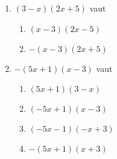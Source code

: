 
\begin{exercice}\label{exosmath-0204}

    \begin{enumerate}
        \item
            \( (3-x)(2x+5)\) vaut
            \begin{enumerate}
                \item
                    \( (x-3)(2x-5)\)
                \item
                    \( -(x-3)(2x+5)\)
            \end{enumerate}
        \item
            \( -(5x+1)(x-3)\) vaut
            \begin{enumerate}
                \item
                    \( (5x+1)(3-x)\)
                \item
                    \( (-5x+1)(x-3)\)
                \item
                    \( (-5x-1)(-x+3)\)
                \item
                    \( -(5x+1)(x+3)\)
            \end{enumerate}
    \end{enumerate}

\end{exercice}
